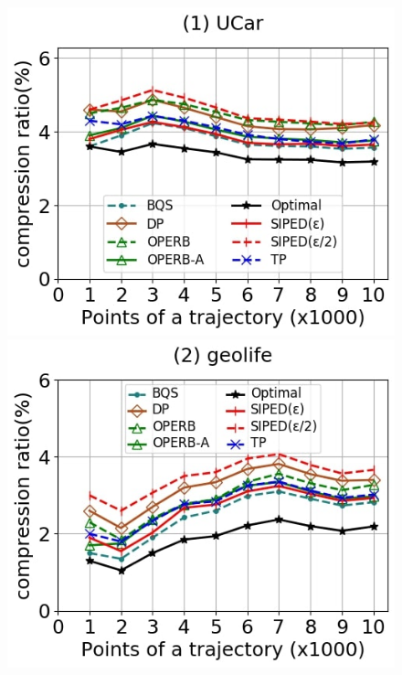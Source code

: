 \begin{figure}[tb!]
	\centering
	\includegraphics[scale=0.250]{Figures/Exp-PED-CR-size-service.jpg} 	\hspace{0.5ex}
	\includegraphics[scale=0.250]{Figures/Exp-PED-CR-size-geolife.jpg}	\hspace{0.5ex}

\end{figure}
